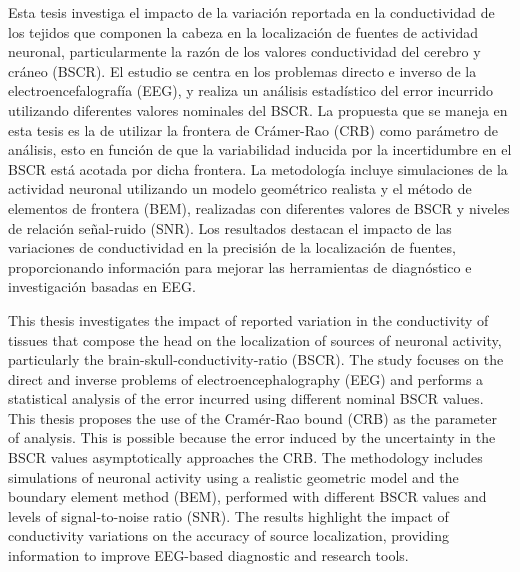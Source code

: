 %

Esta tesis investiga el impacto de la variación reportada en la conductividad de los tejidos que componen la cabeza en la localización de fuentes de actividad neuronal, particularmente la razón de los valores conductividad del cerebro y cráneo (BSCR).
El estudio se centra en los problemas directo e inverso de la electroencefalografía (EEG), y realiza un análisis estadístico del error incurrido utilizando diferentes valores nominales del BSCR.
La propuesta que se maneja en esta tesis es la de utilizar la frontera de Crámer-Rao (CRB) como parámetro de análisis, esto en función de que la variabilidad inducida por la incertidumbre en el BSCR está acotada por dicha frontera.
La metodología incluye simulaciones de la actividad neuronal utilizando un modelo geométrico realista y el método de elementos de frontera (BEM), realizadas con diferentes valores de BSCR y niveles de relación señal-ruido (SNR).
Los resultados destacan el impacto de las variaciones de conductividad en la precisión de la localización de fuentes, proporcionando información para mejorar las herramientas de diagnóstico e investigación basadas en EEG.






This thesis investigates the impact of reported variation in the conductivity of tissues that compose the head on the localization of sources of neuronal activity, particularly the brain-skull-conductivity-ratio (BSCR). 
The study focuses on the direct and inverse problems of electroencephalography (EEG) and performs a statistical analysis of the error incurred using different nominal BSCR values.
This thesis proposes the use of the Cramér-Rao bound (CRB) as the parameter of analysis. This is possible because the error induced by the uncertainty in the BSCR values asymptotically approaches the CRB.
The methodology includes simulations of neuronal activity using a realistic geometric model and the boundary element method (BEM), performed with different BSCR values and levels of signal-to-noise ratio (SNR). 
The results highlight the impact of conductivity variations on the accuracy of source localization, providing information to improve EEG-based diagnostic and research tools.

